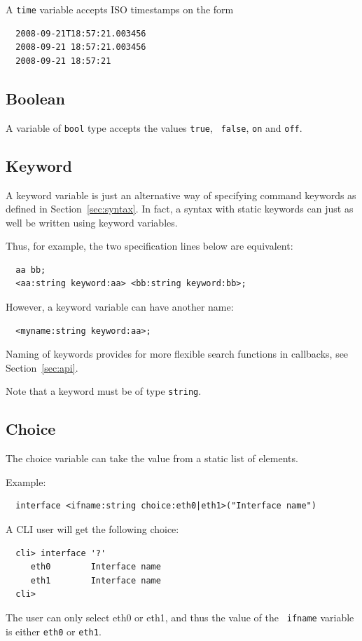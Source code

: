 \documentclass[a4paper, 10pt] {article}
\begin{document}
A {\tt time} variable accepts ISO timestamps on the form

\begin{verbatim}
  2008-09-21T18:57:21.003456
  2008-09-21 18:57:21.003456
  2008-09-21 18:57:21
\end{verbatim}

\subsection{Boolean}

A variable of {\tt bool} type accepts the values {\tt true}, {\tt
  false}, {\tt on} and {\tt off}.

\subsection{Keyword}
\label{sec:keyword}

A keyword variable is just an alternative way of specifying command
keywords as defined in Section~\ref{sec:syntax}. In fact, a syntax
with static keywords can just as well be written using keyword
variables. 

Thus, for example, the two specification lines below are equivalent:
\begin{verbatim}
  aa bb;
  <aa:string keyword:aa> <bb:string keyword:bb>;
\end{verbatim}

However, a keyword variable can have another name:
\begin{verbatim}
  <myname:string keyword:aa>;
\end{verbatim}

Naming of keywords provides for more flexible search functions
in callbacks, see Section~\ref{sec:api}.

Note that a keyword must be of type {\tt string}.

\subsection{Choice}

The choice variable can take the value from a static list of elements.

Example:
\begin{verbatim}
  interface <ifname:string choice:eth0|eth1>("Interface name")
\end{verbatim}

A CLI user will get the following choice:
\begin{verbatim}
  cli> interface '?'
     eth0        Interface name
     eth1        Interface name
  cli> 
\end{verbatim}
The user can only select eth0 or eth1, and thus the value of the {\tt
  ifname} variable is either {\tt eth0} or {\tt eth1}.
\end{document}
